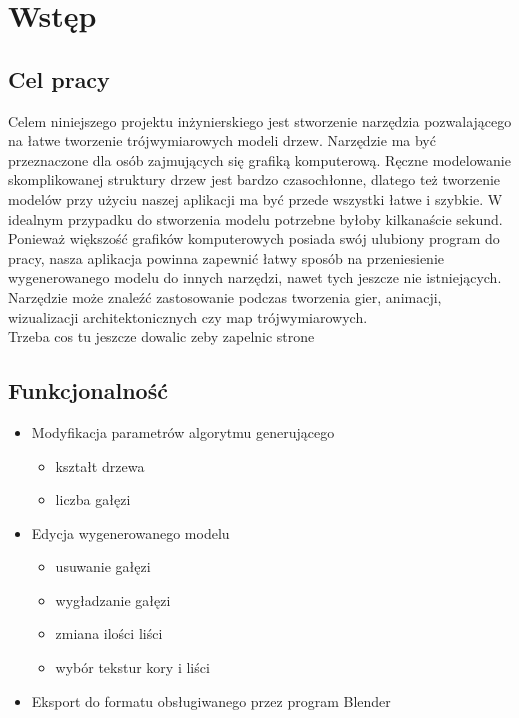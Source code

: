 \chapter{Wstęp}

\section{Cel pracy}
Celem niniejszego projektu inżynierskiego jest stworzenie narzędzia pozwalającego na łatwe 
tworzenie trójwymiarowych modeli drzew. Narzędzie ma być przeznaczone dla osób zajmujących
się grafiką komputerową. Ręczne modelowanie skomplikowanej struktury drzew jest bardzo czasochłonne,
dlatego też tworzenie modelów przy użyciu naszej aplikacji ma być przede wszystki łatwe i szybkie.
W idealnym przypadku do stworzenia modelu potrzebne byłoby kilkanaście sekund. Ponieważ większość
grafików komputerowych posiada swój ulubiony program do pracy, nasza aplikacja powinna zapewnić
łatwy sposób na przeniesienie wygenerowanego modelu do innych narzędzi, nawet tych jeszcze nie istniejących.
Narzędzie może znaleźć zastosowanie podczas tworzenia gier, animacji, wizualizacji architektonicznych
czy map trójwymiarowych.
\\
Trzeba cos tu jeszcze dowalic zeby zapelnic strone


\newpage
\section{Funkcjonalność}
\begin{itemize}
	\item{Modyfikacja parametrów algorytmu generującego}
	\begin{itemize}
		\item{kształt drzewa}
		\item{liczba gałęzi}
	\end{itemize}
	\item{Edycja wygenerowanego modelu}
	\begin{itemize}
		\item{usuwanie gałęzi}
		\item{wygładzanie gałęzi}
		\item{zmiana ilości liści}
		\item{wybór tekstur kory i liści}
	\end{itemize}

	\item{Eksport do formatu obsługiwanego przez program Blender}
\end{itemize}

